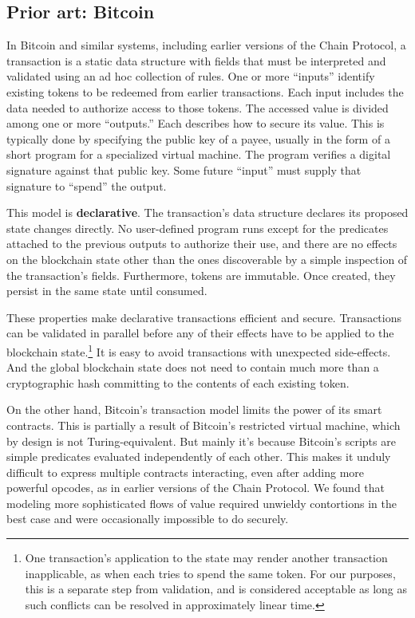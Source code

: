 \documentclass{article}
\begin{document}
\subsection{Prior art: Bitcoin}

In Bitcoin \cite{nakamoto} and similar systems, including earlier
versions of the Chain Protocol, a transaction is a static data
structure with fields that must be interpreted and validated using an
ad hoc collection of rules. One or more ``inputs'' identify existing
tokens to be redeemed from earlier transactions. Each input includes
the data needed to authorize access to those tokens. The accessed
value is divided among one or more ``outputs.'' Each describes how to
secure its value. This is typically done by specifying the public key
of a payee, usually in the form of a short program for a specialized
virtual machine. The program verifies a digital signature against that
public key. Some future ``input'' must supply that signature to
``spend'' the output.

This model is \textbf{declarative}. The transaction's data structure
declares its proposed state changes directly. No user-defined program
runs except for the predicates attached to the previous outputs to
authorize their use, and there are no effects on the blockchain state
other than the ones discoverable by a simple inspection of the
transaction's fields. Furthermore, tokens are immutable. Once created,
they persist in the same state until consumed.

These properties make declarative transactions efficient and
secure. Transactions can be validated in parallel before any of their
effects have to be applied to the blockchain state.\footnote{One transaction's application to the state may render another
transaction inapplicable, as when each tries to spend the same
token. For our purposes, this is a separate step from validation, and is considered acceptable as long as such conflicts can be resolved in approximately linear time.} It
is easy to avoid transactions with unexpected side-effects. And the global blockchain state does not need to contain much more than a cryptographic hash committing to the contents of each existing token.

On the other hand, Bitcoin's transaction model limits the power of its
smart contracts. This is partially a result of Bitcoin's restricted
virtual machine, which by design is not Turing-equivalent. But mainly
it's because Bitcoin's scripts are simple predicates evaluated
independently of each other. This makes it unduly difficult to express
multiple contracts interacting, even after adding more powerful
opcodes, as in earlier versions of the Chain Protocol. We found that
modeling more sophisticated flows of value required unwieldy
contortions in the best case and were occasionally impossible to do
securely.
\end{document}
